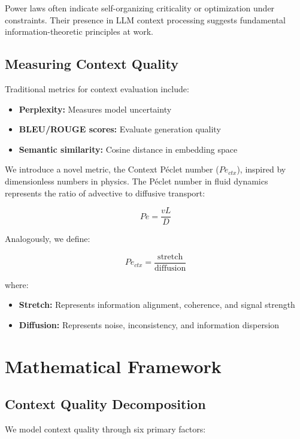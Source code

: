 \documentclass[conference]{IEEEtran}
\begin{document}
Power laws often indicate self-organizing criticality or optimization under constraints. Their presence in LLM context processing suggests fundamental information-theoretic principles at work.

\subsection{Measuring Context Quality}

Traditional metrics for context evaluation include:
\begin{itemize}
\item \textbf{Perplexity:} Measures model uncertainty
\item \textbf{BLEU/ROUGE scores:} Evaluate generation quality
\item \textbf{Semantic similarity:} Cosine distance in embedding space
\end{itemize}

We introduce a novel metric, the Context Péclet number ($Pe_{ctx}$), inspired by dimensionless numbers in physics. The Péclet number in fluid dynamics represents the ratio of advective to diffusive transport:

\begin{equation}
Pe = \frac{vL}{D}
\end{equation}

Analogously, we define:

\begin{equation}
Pe_{ctx} = \frac{\text{stretch}}{\text{diffusion}}
\end{equation}

where:
\begin{itemize}
\item \textbf{Stretch:} Represents information alignment, coherence, and signal strength
\item \textbf{Diffusion:} Represents noise, inconsistency, and information dispersion
\end{itemize}

\section{Mathematical Framework}

\subsection{Context Quality Decomposition}

We model context quality through six primary factors:
\end{document}
